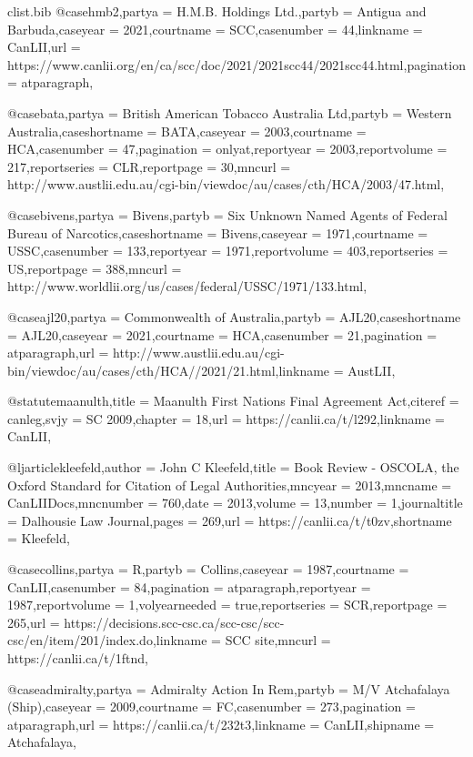 \begin{filecontents*}[overwrite]{clist\jobname.bib}
@case{hmb2,partya = {H.M.B. Holdings Ltd.\@},partyb = {Antigua and Barbuda},caseyear = {2021},courtname = {SCC},casenumber = {44},linkname = {CanLII},url = {https://www.canlii.org/en/ca/scc/doc/2021/2021scc44/2021scc44.html},pagination = {atparagraph},}


@case{bata,partya =  {British American Tobacco Australia Ltd},partyb =  {Western Australia},caseshortname =  {BATA},caseyear =  {2003},courtname =  {HCA},casenumber =  {47},pagination =  {onlyat},reportyear =  {2003},reportvolume =  {217},reportseries =  {CLR},reportpage =  {30},mncurl =  {http://www.austlii.edu.au/cgi-bin/viewdoc/au/cases/cth/HCA/2003/47.html},}

@case{bivens,partya =  {Bivens},partyb =  {Six Unknown Named Agents of Federal Bureau of Narcotics},caseshortname =  {Bivens},caseyear =  {1971},courtname =  {USSC},casenumber =  {133},reportyear =  {1971},reportvolume =  {403},reportseries =  {US},reportpage =  {388},mncurl =  {http://www.worldlii.org/us/cases/federal/USSC/1971/133.html},}

@case{ajl20,partya =  {Commonwealth of Australia},partyb =  {AJL20},caseshortname =  {AJL20},caseyear =  {2021},courtname =  {HCA},casenumber =  {21},pagination =  {atparagraph},url =  {http://www.austlii.edu.au/cgi-bin/viewdoc/au/cases/cth/HCA//2021/21.html},linkname =  {AustLII},}

@statute{maanulth,title =  {Maanulth First Nations Final Agreement Act},citeref =  {canleg},svjy =  {SC 2009},chapter =  {18},url =  {https://canlii.ca/t/l292},linkname =  {CanLII},}

@ljarticle{kleefeld,author =  {John C Kleefeld},title =  {Book Review - OSCOLA, the Oxford Standard for Citation of Legal Authorities},mncyear =  {2013},mncname =  {CanLIIDocs},mncnumber =  {760},date =  {2013},volume =  {13},number =  {1},journaltitle =  {Dalhousie Law Journal},pages =  {269},url =  {https://canlii.ca/t/t0zv},shortname =  {Kleefeld},}

@case{collins,partya =  {R},partyb =  {Collins},caseyear =  {1987},courtname =  {CanLII},casenumber =  {84},pagination =  {atparagraph},reportyear =  {1987},reportvolume =  {1},volyearneeded =  {true},reportseries =  {SCR},reportpage =  {265},url =  {https://decisions.scc-csc.ca/scc-csc/scc-csc/en/item/201/index.do},linkname =  {SCC site},mncurl =  {https://canlii.ca/t/1ftnd},}

@case{admiralty,partya =  {Admiralty Action In Rem},partyb =  {M/V Atchafalaya (Ship)},caseyear =  {2009},courtname =  {FC},casenumber =  {273},pagination =  {atparagraph},url =  {https://canlii.ca/t/232t3},linkname =  {CanLII},shipname =  {Atchafalaya},}



\end{filecontents*}
